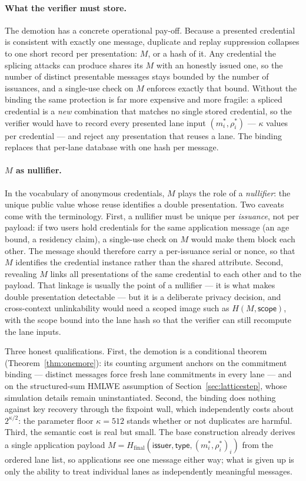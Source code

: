 \documentclass[11pt]{article}
\begin{document}
\paragraph{What the verifier must store.}
The demotion has a concrete operational pay-off.  Because a presented
credential is consistent with exactly one message, duplicate and replay
suppression collapses to one short record per presentation: $M$, or a hash
of it.  Any credential the splicing attacks can produce shares its $M$ with
an honestly issued one, so the number of distinct presentable messages stays
bounded by the number of issuances, and a single-use check on $M$ enforces
exactly that bound.  Without the binding the same protection is far more
expensive and more fragile: a spliced credential is a \emph{new} combination
that matches no single stored credential, so the verifier would have to
record every presented lane input $(m_i^*,\rho_i^*)$ --- $\kappa$ values per
credential --- and reject any presentation that reuses a lane.  The binding
replaces that per-lane database with one hash per message.

\paragraph{$M$ as nullifier.}
In the vocabulary of anonymous credentials, $M$ plays the role of a
\emph{nullifier}: the unique public value whose reuse identifies a double
presentation.  Two caveats come with the terminology.  First, a nullifier
must be unique per \emph{issuance}, not per payload: if two users hold
credentials for the same application message (an age bound, a residency
claim), a single-use check on $M$ would make them block each other.  The
message should therefore carry a per-issuance serial or nonce, so that $M$
identifies the credential instance rather than the shared attribute.
Second, revealing $M$ links all presentations of the same credential to each
other and to the payload.  That linkage is usually the point of a
nullifier --- it is what makes double presentation detectable --- but it is
a deliberate privacy decision, and cross-context unlinkability would need a
scoped image such as $H(M,\mathsf{scope})$, with the scope bound into the
lane hash so that the verifier can still recompute the lane inputs.

Three honest qualifications.  First, the demotion is a conditional theorem
(Theorem~\ref{thm:onemore}): its counting argument anchors on the commitment
binding --- distinct messages force fresh lane commitments in every lane ---
and on the structured-sum HMLWE assumption of Section~\ref{sec:latticestep},
whose simulation details remain uninstantiated.  Second, the binding does
nothing against key recovery through
the fixpoint wall, which independently costs about $2^{\kappa/2}$: the
parameter floor $\kappa=512$ stands whether or not duplicates are harmful.
Third, the semantic cost is real but small.  The base construction already
derives a single application payload
$M=H_{\mathrm{final}}(\mathsf{issuer},\mathsf{type},(m_i^*,\rho_i^*)_i)$ from
the ordered lane list, so applications see one message either way; what is
given up is only the ability to treat individual lanes as independently
meaningful messages.
\end{document}
